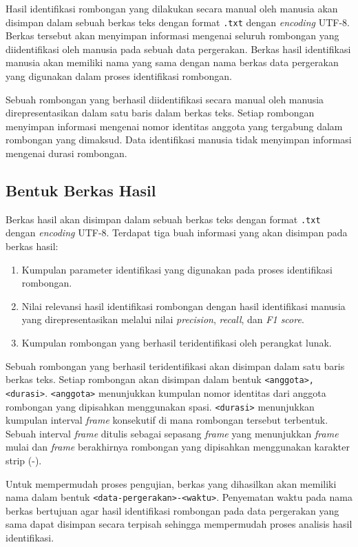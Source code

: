 Hasil identifikasi rombongan yang dilakukan secara manual oleh manusia akan disimpan dalam sebuah berkas teks dengan format \texttt{.txt} dengan \textit{encoding} UTF-8. Berkas tersebut akan menyimpan informasi mengenai seluruh rombongan yang diidentifikasi oleh manusia pada sebuah data pergerakan. Berkas hasil identifikasi manusia akan memiliki nama yang sama dengan nama berkas data pergerakan yang digunakan dalam proses identifikasi rombongan. 

Sebuah rombongan yang berhasil diidentifikasi secara manual oleh manusia direpresentasikan dalam satu baris dalam berkas teks. Setiap rombongan menyimpan informasi mengenai nomor identitas anggota yang tergabung dalam rombongan yang dimaksud. Data identifikasi manusia tidak menyimpan informasi mengenai durasi rombongan. 

\subsection{Bentuk Berkas Hasil}
\label{sec:result-text}

Berkas hasil akan disimpan dalam sebuah berkas teks dengan format \texttt{.txt} dengan \textit{encoding} UTF-8. Terdapat tiga buah informasi yang akan disimpan pada berkas hasil:

\begin{enumerate}
    \item Kumpulan parameter identifikasi yang digunakan pada proses identifikasi rombongan.
    \item Nilai relevansi hasil identifikasi rombongan dengan hasil identifikasi manusia yang direpresentasikan melalui nilai \textit{precision}, \textit{recall}, dan \textit{F1 score}.
    \item Kumpulan rombongan yang berhasil teridentifikasi oleh perangkat lunak.
\end{enumerate}

Sebuah rombongan yang berhasil teridentifikasi akan disimpan dalam satu baris berkas teks. Setiap rombongan akan disimpan dalam bentuk \texttt{<anggota>, <durasi>}. \texttt{<anggota>} menunjukkan kumpulan nomor identitas dari anggota rombongan yang dipisahkan menggunakan spasi. \texttt{<durasi>} menunjukkan kumpulan interval \textit{frame} konsekutif di mana rombongan tersebut terbentuk. Sebuah interval \textit{frame} ditulis sebagai sepasang \textit{frame} yang menunjukkan \textit{frame} mulai dan \textit{frame} berakhirnya rombongan yang dipisahkan menggunakan karakter strip (-).

Untuk mempermudah proses pengujian, berkas yang dihasilkan akan memiliki nama dalam bentuk \texttt{<data-pergerakan>-<waktu>}. Penyematan waktu pada nama berkas bertujuan agar hasil identifikasi rombongan pada data pergerakan yang sama dapat disimpan secara terpisah sehingga mempermudah proses analisis hasil identifikasi.


